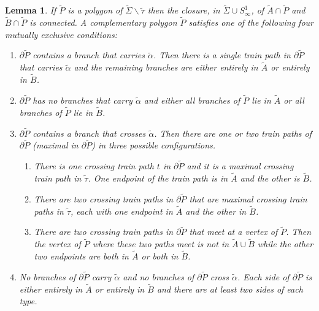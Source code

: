 \documentclass[11pt]{article}
\newtheorem{lemma}[thm]{Lemma}
\theoremstyle{remark}
\begin{document}
\begin{lemma}\label{polygons}
If $\tilde P$ is a polygon of $\tilde\Sigma\smallsetminus\tilde\tau$ then the closure, in $\tilde\Sigma \cup S^1_\infty$, of $\tilde{A} \cap \tilde P$ and  $\tilde{B}\cap \tilde P$  is connected.
A complementary polygon $\tilde P$ satisfies one of the following four mutually
exclusive conditions:
\begin{enumerate}
\item $\partial \tilde P$ contains a branch that carries $\tilde\alpha$. Then there is a single train path in $\partial\tilde P$ that carries $\tilde\alpha$ and the remaining branches are either entirely in $\tilde{A}$ or entirely in $\tilde{B}$.

\item $\partial \tilde P$ has no branches that carry $\tilde\alpha$ and either all
branches of $\tilde P$ lie in $\tilde{A}$ or all branches of $\tilde P$ lie in $\tilde{B}$.
 
\item $\partial \tilde P$ contains a branch that crosses $\tilde\alpha$. Then there are one or two train paths of $\partial \tilde P$ (maximal in $\partial\tilde P$) in three possible configurations.
\begin{enumerate}
\item There is one crossing train path $t$ in $\partial\tilde P$ and it is a maximal crossing train path in $\tilde\tau$. One endpoint of the train path is in $\tilde{A}$ and the other is $\tilde{B}$.

\item There are two crossing train paths in $\partial\tilde P$ that are maximal crossing train paths in $\tilde\tau$, each with one endpoint in $\tilde{A}$ and the other in $\tilde{B}$.

\item There are two crossing train paths in $\partial\tilde P$ that meet at a vertex of $\tilde P$. Then the vertex of $\tilde P$ where these two paths meet is not in $\tilde{A} \cup \tilde{B}$ while the other two endpoints are both in $\tilde{A}$ or both in $\tilde{B}$.
\end{enumerate}

\item No branches of $\partial\tilde P$ carry $\tilde\alpha$ and no branches of $\partial \tilde P$ cross $\tilde\alpha$. Each side of $\partial\tilde P$ is either entirely in $\tilde{A}$ or entirely in $\tilde{B}$ and there are at least two sides of each type.

\end{enumerate}
\end{lemma}
\end{document}
